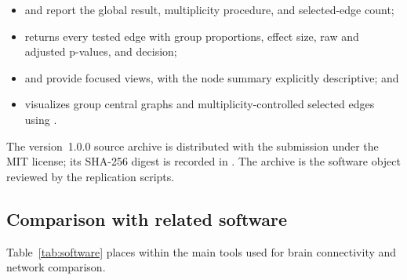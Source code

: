 \documentclass[article]{jss}\usepackage[]{graphicx}\usepackage[]{xcolor}
\begin{document}
\begin{itemize}
  \item {} and  report the global result,
    multiplicity procedure, and selected-edge count;
  \item {} returns every tested edge with group
    proportions, effect size, raw and adjusted p-values, and decision;
  \item {} and  provide focused
    views, with the node summary explicitly descriptive; and
  \item {} visualizes group central graphs and
    multiplicity-controlled selected edges using .
\end{itemize}

The version~1.0.0 source archive is distributed with the submission under the
MIT license; its SHA-256 digest is recorded in
. The archive is the software object reviewed by the
replication scripts.

\subsection{Comparison with related software}

Table~\ref{tab:software} places  within the main
 tools used for brain connectivity and network comparison.

\begin{table}[t]
\centering
\small
{}
\caption{Related  software for connectivity and network analysis.
The packages operate at different stages of a neuroimaging workflow and target
different hypotheses.}
\label{tab:software}
\end{table}
\end{document}
